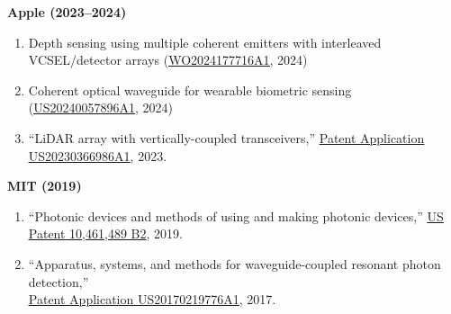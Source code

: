 \noindent\textbf{Apple (2023--2024)}
\begin{enumerate}
    \item Depth sensing using multiple coherent emitters with interleaved VCSEL/detector arrays (\href{https://patents.google.com/patent/WO2024177716A1}{\underline{WO2024177716A1}}, 2024)
    \item Coherent optical waveguide for wearable biometric sensing (\href{https://patents.google.com/patent/US20240057896A1}{\underline{US20240057896A1}}, 2024)
    \item ``LiDAR array with vertically-coupled transceivers,'' \href{https://patents.google.com/patent/US20230366986A1}{\underline{Patent Application US20230366986A1}}, 2023.
\end{enumerate}

\noindent\textbf{MIT (2019)}
\begin{enumerate}
    \item ``Photonic devices and methods of using and making photonic devices,'' \href{https://patents.google.com/patent/US10461489B2}{\underline{US Patent 10,461,489 B2}}, 2019.
    \item ``Apparatus, systems, and methods for waveguide-coupled resonant photon detection,'' \\
    \href{https://patents.google.com/patent/US20170219776A1}{\underline{Patent Application US20170219776A1}}, 2017.
\end{enumerate}
